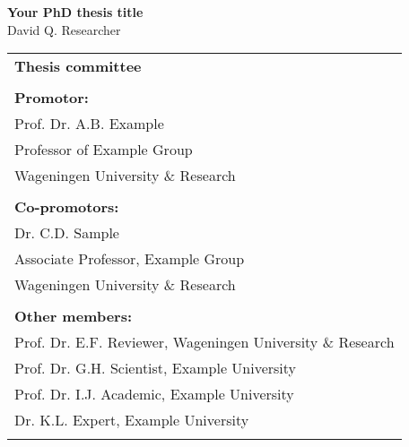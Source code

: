 \thispagestyle{empty}
\begin{center}
\Huge{\textbf{Your PhD thesis title}} \\
\vspace*{1cm}
\vspace*{1cm}
\vspace*{\fill}
\large{David Q. Researcher}\\
\end{center}

\newpage
\thispagestyle{empty}
\vspace*{\fill}
\begin{tabular}{l}
    \textbf{Thesis committee}                                                                 \\  
                                                                                              \\  
    \textbf{Promotor:}                                                                        \\
    Prof. Dr. A.B. Example                                                                 \\
    Professor of Example Group                                                   \\
    Wageningen University \& Research                                                   \\
                                                                                              \\  
    \textbf{Co-promotors:}                                                                    \\
    Dr. C.D. Sample                                                                    \\
    Associate Professor, Example Group                             \\
    Wageningen University \& Research                                           \\
                                                                                              \\  

    \textbf{Other members:}                                                                   \\
    Prof. Dr. E.F. Reviewer, Wageningen University \& Research          \\
    Prof. Dr. G.H. Scientist, Example University                   \\
    Prof. Dr. I.J. Academic, Example University                                   \\
    Dr. K.L. Expert, Example University                                  \\
    \\  


\end{tabular}
